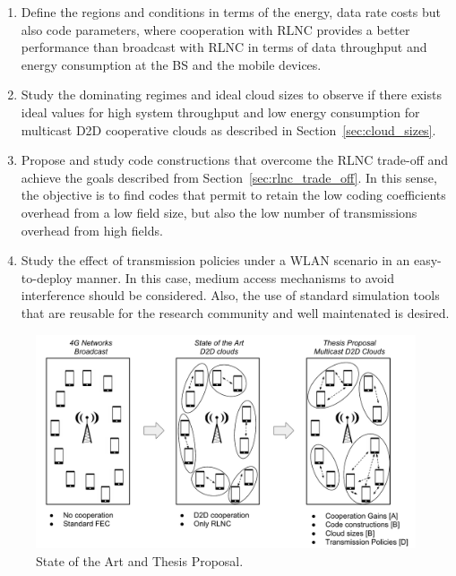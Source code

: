 \begin{enumerate}

\item Define the regions and conditions in terms of the energy, data rate costs but also code parameters, where cooperation with \ac{RLNC} provides a better performance than broadcast with \ac{RLNC} in terms of data throughput and energy consumption at the \ac{BS} and the mobile devices.

\item Study the dominating regimes and ideal cloud sizes to observe if there exists ideal values for high system throughput and low energy consumption for multicast \ac{D2D} cooperative clouds as described in Section~\ref{sec:cloud_sizes}.

\item Propose and study code constructions that overcome the \ac{RLNC} trade-off and achieve the goals described from Section~\ref{sec:rlnc_trade_off}. In this sense, the objective is to find codes that permit to retain the low coding coefficients overhead from a low field size, but also the low number of transmissions overhead from high fields.

\item Study the effect of transmission policies under a \ac{WLAN} scenario in an easy-to-deploy manner. In this case, medium access mechanisms to avoid interference should be considered. Also, the use of standard simulation tools that are reusable for the research community and well maintenated is desired.

\end{enumerate}

\begin{figure}[h]
  \centering
  \includegraphics[width=\textwidth]{introduction/figures/thesis-diagrams.pdf}
  \caption{State of the Art and Thesis Proposal.}
\label{fig:proposal}
\end{figure}

